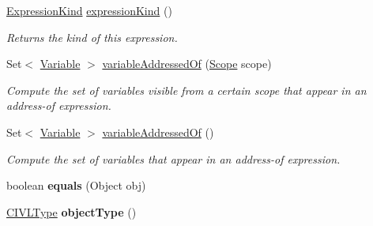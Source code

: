 \begin{DoxyCompactItemize}
\hyperlink{enumedu_1_1udel_1_1cis_1_1vsl_1_1civl_1_1model_1_1IF_1_1expression_1_1Expression_1_1ExpressionKind}{Expression\+Kind} \hyperlink{classedu_1_1udel_1_1cis_1_1vsl_1_1civl_1_1model_1_1common_1_1expression_1_1CommonMemoryUnitExpression_a2475c2ec05be0be23c6a2141df5f34c8}{expression\+Kind} ()
\begin{DoxyCompactList}\small\item\em Returns the kind of this expression. \end{DoxyCompactList}\item 
Set$<$ \hyperlink{interfaceedu_1_1udel_1_1cis_1_1vsl_1_1civl_1_1model_1_1IF_1_1variable_1_1Variable}{Variable} $>$ \hyperlink{classedu_1_1udel_1_1cis_1_1vsl_1_1civl_1_1model_1_1common_1_1expression_1_1CommonMemoryUnitExpression_a2facb8fbb962791b60b0da077402bc60}{variable\+Addressed\+Of} (\hyperlink{interfaceedu_1_1udel_1_1cis_1_1vsl_1_1civl_1_1model_1_1IF_1_1Scope}{Scope} scope)
\begin{DoxyCompactList}\small\item\em Compute the set of variables visible from a certain scope that appear in an address-\/of expression. \end{DoxyCompactList}\item 
Set$<$ \hyperlink{interfaceedu_1_1udel_1_1cis_1_1vsl_1_1civl_1_1model_1_1IF_1_1variable_1_1Variable}{Variable} $>$ \hyperlink{classedu_1_1udel_1_1cis_1_1vsl_1_1civl_1_1model_1_1common_1_1expression_1_1CommonMemoryUnitExpression_a79cd3d815c19ce8b1a292fb07de4882d}{variable\+Addressed\+Of} ()
\begin{DoxyCompactList}\small\item\em Compute the set of variables that appear in an address-\/of expression. \end{DoxyCompactList}\item 
\hypertarget{classedu_1_1udel_1_1cis_1_1vsl_1_1civl_1_1model_1_1common_1_1expression_1_1CommonMemoryUnitExpression_a897e312a4ba021493b90f2d20f2a37c4}{}boolean {\bfseries equals} (Object obj)\label{classedu_1_1udel_1_1cis_1_1vsl_1_1civl_1_1model_1_1common_1_1expression_1_1CommonMemoryUnitExpression_a897e312a4ba021493b90f2d20f2a37c4}

\item 
\hypertarget{classedu_1_1udel_1_1cis_1_1vsl_1_1civl_1_1model_1_1common_1_1expression_1_1CommonMemoryUnitExpression_a84044b0da3f7161877657d61b5add88d}{}\hyperlink{interfaceedu_1_1udel_1_1cis_1_1vsl_1_1civl_1_1model_1_1IF_1_1type_1_1CIVLType}{C\+I\+V\+L\+Type} {\bfseries object\+Type} ()\label{classedu_1_1udel_1_1cis_1_1vsl_1_1civl_1_1model_1_1common_1_1expression_1_1CommonMemoryUnitExpression_a84044b0da3f7161877657d61b5add88d}


\end{DoxyCompactItemize}
